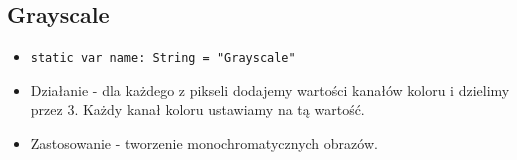 \documentclass[a4paper]{article}
\begin{document}
\subsection{Grayscale}

\begin{itemize}
    \item \texttt{static var name: String = "Grayscale"}
    \item Działanie - dla każdego z pikseli dodajemy wartości kanałów koloru i dzielimy przez 3. Każdy kanał koloru ustawiamy na tą wartość.
    \item Zastosowanie - tworzenie monochromatycznych obrazów.
\end{itemize}

\begin{figure}[H]
    \centering
    \begin{subfigure}{0.2\textwidth}
        \centering

\end{subfigure}
\end{figure}
\end{document}
